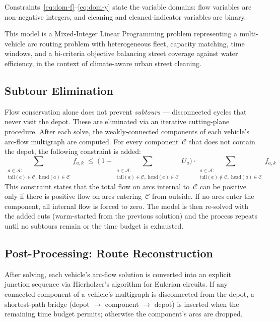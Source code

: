 \documentclass[11pt]{article}
\begin{document}
Constraints~\eqref{eq:dom-f}--\eqref{eq:dom-y} state the variable domains:
flow variables are non-negative integers, and cleaning and cleaned-indicator
variables are binary.

This model is a Mixed-Integer Linear Programming problem representing a
multi-vehicle arc routing problem with heterogeneous fleet, capacity
matching, time windows, and a bi-criteria objective balancing street
coverage against water efficiency, in the context of climate-aware urban
street cleaning.

\subsection{Subtour Elimination}

Flow conservation alone does not prevent \emph{subtours} --- disconnected
cycles that never visit the depot.  These are eliminated via an iterative
cutting-plane procedure.  After each solve, the weakly-connected components
of each vehicle's arc-flow multigraph are computed.  For every
component~$\mathcal{C}$ that does not contain the depot, the following
constraint is added:
%
\begin{equation}\tag{13}\label{eq:subtour}
\sum_{\substack{a \in \mathcal{A}:\\ \mathrm{tail}(a) \in \mathcal{C},\;
      \mathrm{head}(a) \in \mathcal{C}}} f_{a,k}
\;\le\;
\Biggl(\,1 + \!\!
  \sum_{\substack{a \in \mathcal{A}:\\ \mathrm{tail}(a) \in \mathcal{C},\;
        \mathrm{head}(a) \in \mathcal{C}}} U_a
\Biggr)
\cdot
\sum_{\substack{a \in \mathcal{A}:\\ \mathrm{tail}(a) \notin \mathcal{C},\;
      \mathrm{head}(a) \in \mathcal{C}}} f_{a,k}
\end{equation}
%
This constraint states that the total flow on arcs internal to~$\mathcal{C}$
can be positive only if there is positive flow on arcs entering~$\mathcal{C}$
from outside.  If no arcs enter the component, all internal flow is forced
to zero.  The model is then re-solved with the added cuts (warm-started
from the previous solution) and the process repeats until no subtours remain
or the time budget is exhausted.

\subsection{Post-Processing: Route Reconstruction}

After solving, each vehicle's arc-flow solution is converted into an
explicit junction sequence via Hierholzer's algorithm for Eulerian circuits.
If any connected component of a vehicle's multigraph is disconnected from
the depot, a shortest-path bridge (depot $\to$ component $\to$ depot) is
inserted when the remaining time budget permits; otherwise the component's
arcs are dropped.
\end{document}
